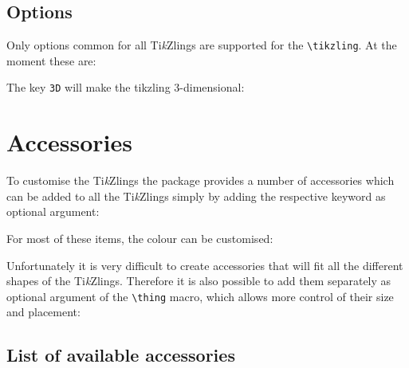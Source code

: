 \documentclass[parskip=half]{scrartcl}
\newcommand{\tikzlings}{Ti\emph{k}Zlings\xspace}
\begin{document}
\subsection{Options}

Only options common for all \tikzlings are supported for the \lstinline|\tikzling|. At the moment these are: 

\begin{tcblisting}{}
\tikzling[body=SteelBlue]
\end{tcblisting}

The key \lstinline|3D| will make the tikzling 3-dimensional:

\begin{tcblisting}{}
\tikzling[3D]
\end{tcblisting}

\clearpage
\section{Accessories}

To customise the \tikzlings the package provides a number of accessories which can be added to all the \tikzlings simply by adding the respective keyword as optional argument:

\begin{tcblisting}{}
\bear[hat]
\end{tcblisting}
 
For most of these items, the colour can be customised:

\begin{tcblisting}{}
\koala[crown=orange!50!yellow]
\end{tcblisting}

Unfortunately it is very difficult to create accessories that will fit all the different shapes of the \tikzlings. Therefore it is also possible to add them separately as optional argument of the \lstinline|\thing| macro, which allows more control of their size and placement:

\begin{tcblisting}{}
\owl
\thing[tophat,scale=1.5,yshift=-0.6cm,xshift=-0.05cm]
\end{tcblisting}

\subsection{List of available accessories}

\begin{tcblisting}{}
\tikzling[tophat]
\end{tcblisting}

\begin{tcblisting}{}
\tikzling[hat]
\end{tcblisting}

\begin{tcblisting}{}
\tikzling[alien]
\end{tcblisting}

\begin{tcblisting}{}
\tikzling[crown]
\end{tcblisting}

\begin{tcblisting}{}
\tikzling[crystalball]
\end{tcblisting}
\end{document}
